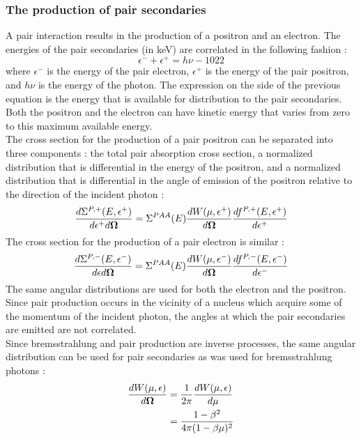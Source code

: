 \subsubsection{The production of pair secondaries}
A pair interaction results in the production of a positron and an electron.
The energies of the pair secondaries (in keV) are correlated in the following
fashion :
\begin{equation}
\epsilon^- + \epsilon^+ = h \nu -1022
\end{equation}
where $\epsilon^-$ is the energy of the pair electron, $\epsilon^+$ is the
energy of the pair positron, and $h\nu$ is the energy of the photon. The
expression on the side of the previous equation is the energy that is
available for distribution to the pair secondaries. Both the positron and the
electron can have kinetic energy that varies from zero to this maximum
available energy.\\
The cross section for the production of a pair positron can be separated into
three components : the total pair absorption cross section, a normalized
distribution that is differential in the energy of the positron, and a
normalized distribution that is differential in the angle of emission of the
positron relative to the direction of the incident photon :
\begin{equation}
\frac{d\Sigma^{P,+}(E,\epsilon^+)}{d\epsilon^+ d\boldsymbol{\Omega}} = \Sigma^{PAA}(E)
\frac{dW(\mu,\epsilon^+)}{d\boldsymbol{\Omega}} \frac{df^{P,+}(E,\epsilon^+)}{d\epsilon^+}
\end{equation}
The cross section for the production of a pair electron is similar :
\begin{equation}
\frac{d\Sigma^{P,-}(E,\epsilon^-)}{d\epsilon d\boldsymbol{\Omega}} = \Sigma^{PAA}(E)
\frac{dW(\mu,\epsilon^-)}{d\boldsymbol{\Omega}} \frac{df^{P,-}(E,\epsilon^-)}{d\epsilon^-}
\end{equation}
The same angular distributions are used for both the electron and the
positron. Since pair production occurs in the vicinity of a nucleus which
acquire some of the momentum of the incident photon, the angles at which the
pair secondaries are emitted are not correlated.\\
Since bremsstrahlung and pair production are inverse processes, the same
angular distribution can be used for pair secondaries as was used for
bremsstrahlung photons :
\begin{equation}
\begin{split}
\frac{dW(\mu,\epsilon)}{d\boldsymbol{\Omega}} &= \frac{1}{2\pi}
\frac{dW(\mu,\epsilon)}{d\mu}\\
&= \frac{1-\beta^2}{4\pi(1-\beta \mu)^2}
\end{split}
\end{equation}
